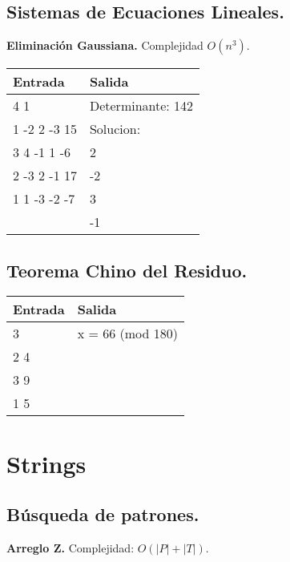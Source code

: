 \documentclass[10pt, letterpaper, twoside]{article}
\begin{document}
\subsection{Sistemas de Ecuaciones Lineales.}

\textbf{Eliminación Gaussiana.} Complejidad $O(n^3)$.



\begin{tabular}{|p{7cm}|p{7cm}|}
\hline
\textbf{Entrada} & \textbf{Salida}\\ \hline
4 1          & Determinante: 142\\
1 -2 2 -3 15 & Solucion:\\ 
3 4 -1 1 -6  & 2\\ 
2 -3 2 -1 17 & -2\\ 
1 1 -3 -2 -7 & 3\\ 
             & -1\\ \hline
\end{tabular}\bigskip

\subsection{Teorema Chino del Residuo.}



\begin{tabular}{|p{7cm}|p{7cm}|}
\hline
\textbf{Entrada} & \textbf{Salida}\\ \hline
3   & x = 66 (mod 180)\\
2 4 & \\ 
3 9 & \\ 
1 5 & \\ \hline
\end{tabular}

\newpage

\section{Strings}

\subsection{Búsqueda de patrones.}

\textbf{Arreglo Z.} Complejidad: $O(|P| + |T|)$.


\end{document}
